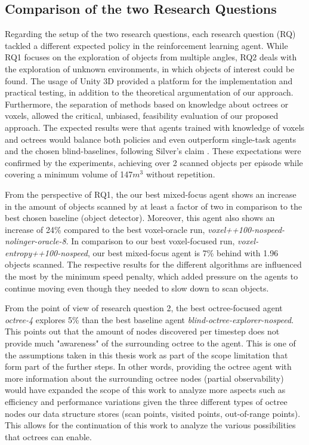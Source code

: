     \subsection{Comparison of the two Research Questions}
        Regarding the setup of the two research questions, each research question (RQ) tackled a different expected policy in the reinforcement learning agent. While RQ1 focuses on the exploration of objects from multiple angles, RQ2 deals with the exploration of unknown environments, in which objects of interest could be found. The usage of Unity 3D provided a platform for the implementation and practical testing, in addition to the theoretical argumentation of our approach.
        Furthermore, the separation of methods based on knowledge about octrees or voxels, allowed the critical, unbiased, feasibility evaluation of our proposed approach.
        The expected results were that agents trained with knowledge of voxels and octrees would balance both policies and even outperform single-task agents and the chosen blind-baselines, following Silver's claim \textcite{silver2021reward}. These expectations were confirmed by the experiments, achieving over 2 scanned objects per episode while covering a minimum volume of 147$m^3$ without repetition. 
        
        From the perspective of RQ1, the our best mixed-focus agent shows an increase in the amount of objects scanned by at least a factor of two in comparison to the best chosen baseline (object detector). Moreover, this agent also shows an increase of 24\% compared to the best voxel-oracle run, \textit{voxel++100-nospeed-nolinger-oracle-8}.
        In comparison to our best voxel-focused run, \textit{voxel-entropy++100-nospeed}, our best mixed-focus agent is 7\% behind with 1.96 objects scanned.
        The respective results for the different algorithms are influenced the most by the minimum speed penalty, which added pressure on the agents to continue moving even though they needed to slow down to scan objects.

        From the point of view of research question 2, the best octree-focused agent \textit{octree-4} explores 5\% than the best baseline agent \textit{blind-octree-explorer-nospeed}. This points out that the amount of nodes discovered per timestep does not provide much "awareness" of the surrounding octree to the agent. This is one of the assumptions taken in this thesis work as part of the scope limitation that form part of the further steps. In other words, providing the octree agent with more information about the surrounding octree nodes (partial observability) would have expanded the scope of this work to analyze more aspects such as efficiency and performance variations given the three different types of octree nodes our data structure stores (scan points, visited points, out-of-range points). This allows for the continuation of this work to analyze the various possibilities that octrees can enable.  
        
